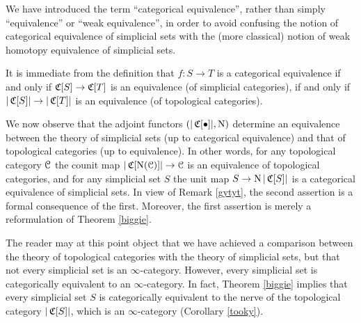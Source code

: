 \begin{remark}
We have introduced the term ``categorical equivalence'', rather than simply ``equivalence'' or ``weak equivalence'', in order to avoid confusing the notion of categorical equivalence of simplicial sets with the (more classical) notion of weak homotopy equivalence of simplicial sets.
\end{remark}

\begin{remark}\label{gytyt}
It is immediate from the definition that $f: S \rightarrow T$ is a categorical equivalence if and only if
$\operatorname{\mathfrak{C}}[S] \rightarrow \operatorname{\mathfrak{C}}[T]$ is an equivalence (of simplicial categories), if and only if $|\operatorname{\mathfrak{C}}[S]| \rightarrow |\operatorname{\mathfrak{C}}[T]|$ is an equivalence (of topological categories).
\end{remark}

We now observe that the adjoint functors $(|\operatorname{\mathfrak{C}}[ \bullet ]|, \operatorname{N} )$
determine an equivalence between the theory of simplicial sets (up to categorical equivalence)
and that of topological categories (up to equivalence). In other words, for any
topological category $\operatorname{\mathcal{C}}$ the counit map
$|\operatorname{\mathfrak{C}}[ \operatorname{N}(\operatorname{\mathcal{C}})] | \rightarrow \operatorname{\mathcal{C}}$ is an equivalence of topological categories, and for any simplicial set $S$ the unit map
$S \rightarrow \operatorname{N} |\operatorname{\mathfrak{C}}[S]|$
is a categorical equivalence of simplicial sets. In view of Remark \ref{gytyt}, the second assertion is a formal consequence of the first. Moreover, the first assertion is merely a reformulation of Theorem \ref{biggie}.

\begin{remark}
The reader may at this point object that we have achieved a comparison between the theory of topological categories with the theory of simplicial sets, but that not every simplicial set is an $\infty$-category. However, every simplicial set is categorically equivalent to an $\infty$-category. In fact, Theorem \ref{biggie} implies that every simplicial set $S$ is categorically equivalent to the nerve of the topological category $| \operatorname{\mathfrak{C}}[S] |$, which is an $\infty$-category (Corollary \ref{tooky}).
\end{remark}



